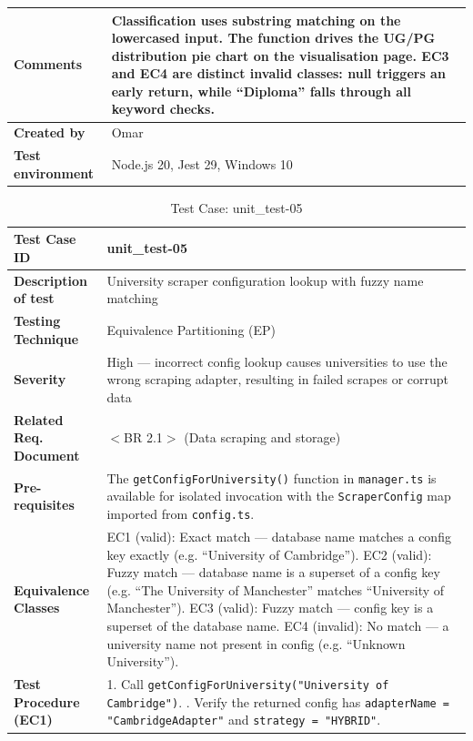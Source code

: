 \begin{table}[h!]
\begin{tabular}{|p{}|p{}|}
\textbf{Comments} & Classification uses substring matching on the lowercased input. The function drives the UG/PG distribution pie chart on the visualisation page. EC3 and EC4 are distinct invalid classes: null triggers an early return, while ``Diploma'' falls through all keyword checks. \\ \hline
\textbf{Created by} & Omar \\ \hline
\textbf{Test environment} & Node.js 20, Jest 29, Windows 10 \\ \hline
\end{tabular}
\end{table}

\begin{table}[h!]
\centering
\caption{Test Case: unit\_test-05}
\begin{tabular}{|p{}|p{}|}
\hline
\textbf{Test Case ID} & unit\_test-05 \\ \hline
\textbf{Description of test} & University scraper configuration lookup with fuzzy name matching \\ \hline
\textbf{Testing Technique} & Equivalence Partitioning (EP) \\ \hline
\textbf{Severity} & High --- incorrect config lookup causes universities to use the wrong scraping adapter, resulting in failed scrapes or corrupt data \\ \hline
\textbf{Related Req. Document} & $<$BR 2.1$>$ (Data scraping and storage) \\ \hline
\textbf{Pre-requisites} & The \texttt{getConfigForUniversity()} function in \texttt{manager.ts} is available for isolated invocation with the \texttt{ScraperConfig} map imported from \texttt{config.ts}. \\ \hline
\textbf{Equivalence Classes} & EC1 (valid): Exact match --- database name matches a config key exactly (e.g. ``University of Cambridge''). \newline EC2 (valid): Fuzzy match --- database name is a superset of a config key (e.g. ``The University of Manchester'' matches ``University of Manchester''). \newline EC3 (valid): Fuzzy match --- config key is a superset of the database name. \newline EC4 (invalid): No match --- a university name not present in config (e.g. ``Unknown University''). \\ \hline
\textbf{Test Procedure (EC1)} & 1. Call \texttt{getConfigForUniversity("University of Cambridge")}. \newline 2. Verify the returned config has \texttt{adapterName = "CambridgeAdapter"} and \texttt{strategy = "HYBRID"}. \\ \hline

\end{tabular}
\end{table}
